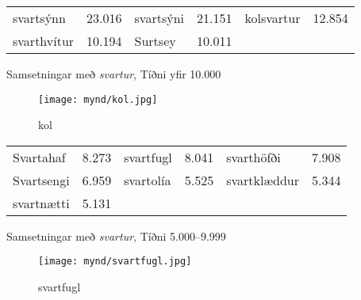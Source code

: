 \documentclass[../samsetningasafn.tex]{subfiles}
\begin{document}
\begin{wordlist}[H]
\begin{tcolorbox}

	\setlength{\extrarowheight}{3pt} 
	\begin{tabular}{BlBlBl}
		svartsýnn	& 23.016 	& 
		svartsýni 	& 21.151 	& 
		kolsvartur 	& 12.854 	\\ 
		svarthvítur 	& 10.194 	& 
		Surtsey 	& 10.011 	& 
				&		
	\end{tabular}

\end{tcolorbox}
	\caption{Samsetningar með \textit{svartur}, Tíðni yfir 10.000}
	\label{listi:svart.10000}
\end{wordlist}

\begin{figure}[H]
\begin{tcolorbox}
\centering
	\texttt{[image: mynd/kol.jpg]}
\end{tcolorbox}
	\caption{kol}
	\label{mynd:kol}
\end{figure}

\begin{wordlist}[H]
\begin{tcolorbox}

	\setlength{\extrarowheight}{3pt}
	\begin{tabular}{BlBlBl}
		Svartahaf	& 8.273	& 
		svartfugl	& 8.041	& 
		svarthöfði	& 7.908	\\ 
		Svartsengi 	& 6.959	& 
		svartolía	& 5.525	& 
		svartklæddur & 5.344	\\ 
		svartnætti	& 5.131	& 
				&		&
				&		
	\end{tabular}

\end{tcolorbox}
	\caption{Samsetningar með \textit{svartur}, Tíðni 5.000--9.999}
	\label{listi:svart.5000}
\end{wordlist}

\begin{figure}[H]
\begin{tcolorbox}
\centering
	\texttt{[image: mynd/svartfugl.jpg]}
\end{tcolorbox}
	\caption{svartfugl}
	\label{mynd:svartfugl}
\end{figure}
\end{document}

